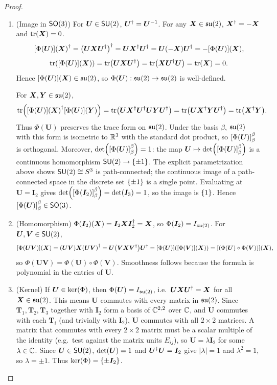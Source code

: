 \documentclass[11pt,reqno]{amsart}
\begin{document}
\begin{proof}
\begin{enumerate}
\item (Image in $\operatorname{\mathsf{SO}}(3)$)
For $\bm U\in\operatorname{\mathsf{SU}}(2)$, $\bm U^{\dagger}=\bm U^{-1}$.
For any $\bm X\in\mathfrak{su}(2)$, $\bm X^{\dagger}=-\bm X$ and $\tr\Br{\bm X}=0$.
\[
\FUNC{\Phi(\bm U)}{\bm X}\herm
=\Br{\bm U\bm X\bm U\herm}\herm
=\bm U\bm X\herm\bm U\herm
=\bm U(-\bm X)\bm U\herm
=-\FUNC{\Phi(\bm U)}{\bm X},
\]
\[
\tr\Br{\FUNC{\Phi(\bm U)}{\bm X}}
=\tr\Br{\bm U\bm X\bm U\herm}
=\tr\Br{\bm X\bm U\herm\bm U}
=\tr\Br{\bm X}=0.
\]
Hence $\FUNC{\Phi(\bm U)}{\bm X}\in\su(2)$, so
$\Phi(\bm U):\mathfrak{su}(2)\to\mathfrak{su}(2)$ is well-defined.

For $\bm X,\bm Y\in\mathfrak{su}(2)$,
\[
\tr\Br{\FUNC{\Phi(\bm U)}{\bm X}\herm\FUNC{\Phi(\bm U)}{\bm Y}}
=\tr\Br{\bm U\bm X\herm\bm U\herm\bm U\bm Y\bm U\herm}
=\tr\Br{\bm U\bm X\herm\bm Y\bm U\herm}
=\tr\Br{\bm X\herm\bm Y}.
\]
Thus $\Phi(\bm U)$ preserves the trace form on $\mathfrak{su}(2)$.  Under the basis
$\beta$, $\mathfrak{su}(2)$ with this form is isometric to $\mathbb{R}^3$ with the standard
dot product, so $\SqBr{\Phi(\bm U)}_\beta^\beta$ is orthogonal.  Moreover,
$\det\Br{\SqBr{\Phi(\bm U)}_\beta^\beta}=1$:
the map $\bm U\mapsto\det\Br{\SqBr{\Phi(\bm U)}_\beta^\beta}$ is a continuous
homomorphism $\SU(2)\to\set{\pm1}$.  The explicit parametrization above shows
$\operatorname{\mathsf{SU}}(2)\cong S^3$ is path-connected; the continuous image of a path-connected
space in the discrete set $\set{\pm1}$ is a single point.  Evaluating at
$\bm U=\bm I_2$ gives $\det\Br{\SqBr{\Phi(\bm I_2)}_\beta^\beta}=\det\Br{\bm I_3}=1$,
so the image is $\set{1}$.
Hence $\SqBr{\Phi(\bm U)}_\beta^\beta\in\SO(3)$.

\item (Homomorphism)
$\Phi(\bm I_2)(\bm X)=\bm I_2\bm X\bm I_2^{\dagger}=\bm X$, so
$\Phi(\bm I_2)=I_{\mathfrak{su}(2)}$.
For $\bm U,\bm V\in\operatorname{\mathsf{SU}}(2)$,
\[
\FUNC{\Phi(\bm U\bm V)}{\bm X}
=\Br{\bm U\bm V}\bm X\Br{\bm U\bm V}\herm
=\bm U\Br{\bm V\bm X\bm V\herm}\bm U\herm
=\FUNC{\Phi(\bm U)}{\FUNC{\Phi(\bm V)}{\bm X}}
=\FUNC{(\Phi(\bm U)\circ\Phi(\bm V))}{\bm X},
\]
so $\Phi(\bm U\bm V)=\Phi(\bm U)\circ\Phi(\bm V)$.  Smoothness follows
because the formula is polynomial in the entries of $\bm U$.

\item (Kernel)
If $\bm U\in\ker\Br{\Phi}$, then $\Phi(\bm U)=I_{\mathfrak{su}(2)}$, i.e.\
$\bm U\bm X\bm U^{\dagger}=\bm X$ for all $\bm X\in\mathfrak{su}(2)$.
This means $\bm U$ commutes with every matrix in $\mathfrak{su}(2)$.
Since $\bm T_1,\bm T_2,\bm T_3$ together with $\bm I_2$ form a basis of
$\mathbb{C}^{2,2}$ over $\mathbb{C}$, and $\bm U$ commutes with each $\bm T_i$ (and
trivially with $\bm I_2$), $\bm U$ commutes with all $2\times 2$ matrices.
A matrix that commutes with every $2\times 2$ matrix must be a scalar
multiple of the identity (e.g.\ test against the matrix units $E_{ij}$),
so $\bm U=\lambda\bm I_2$ for some
$\lambda\in\mathbb{C}$.  Since $\bm U\in\operatorname{\mathsf{SU}}(2)$, $\det\Br{\bm U}=1$ and
$\bm U^{\dagger}\bm U=\bm I_2$ give $|\lambda|=1$ and $\lambda^2=1$, so
$\lambda=\pm1$.  Thus $\ker\Br{\Phi}=\set{\pm\bm I_2}$.


\end{enumerate}
\end{proof}
\end{document}
